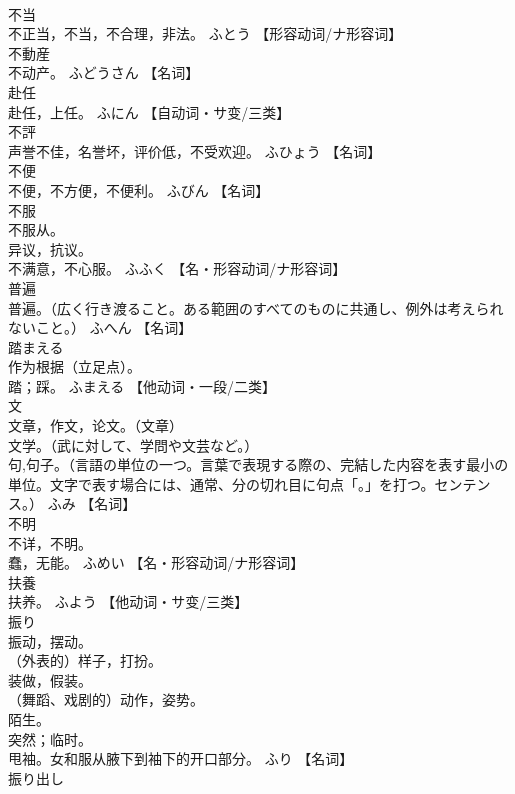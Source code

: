 \documentclass[8pt]{extreport}
\begin{document}
\begin{CJK}{UTF8}{min}
\\	不当	
\\	不正当，不当，不合理，非法。	ふとう		【形容动词/ナ形容词】
\\	不動産	
\\	不动产。	ふどうさん		【名词】
\\	赴任	
\\	赴任，上任。	ふにん		【自动词・サ变/三类】
\\	不評	
\\	声誉不佳，名誉坏，评价低，不受欢迎。	ふひょう		【名词】
\\	不便	
\\	不便，不方便，不便利。	ふびん		【名词】
\\	不服	
\\	不服从。 
\\	异议，抗议。 
\\	不满意，不心服。	ふふく		【名・形容动词/ナ形容词】
\\	普遍	
\\	普遍。（広く行き渡ること。ある範囲のすべてのものに共通し、例外は考えられないこと。）	ふへん		【名词】
\\	踏まえる	
\\	作为根据（立足点）。 
\\	踏；踩。	ふまえる		【他动词・一段/二类】
\\	文	
\\	文章，作文，论文。（文章） 
\\	文学。（武に対して、学問や文芸など。） 
\\	句,句子。（言語の単位の一つ。言葉で表現する際の、完結した内容を表す最小の単位。文字で表す場合には、通常、分の切れ目に句点「。」を打つ。センテンス。）	ふみ		【名词】
\\	不明	
\\	不详，不明。 
\\	蠢，无能。	ふめい		【名・形容动词/ナ形容词】
\\	扶養	
\\	扶养。	ふよう		【他动词・サ变/三类】
\\	振り	
\\	振动，摆动。 
\\	（外表的）样子，打扮。 
\\	装做，假装。 
\\	（舞蹈、戏剧的）动作，姿势。 
\\	陌生。 
\\	突然；临时。 
\\	甩袖。女和服从腋下到袖下的开口部分。	ふり		【名词】
\\	振り出し	

\end{CJK}
\end{document}
